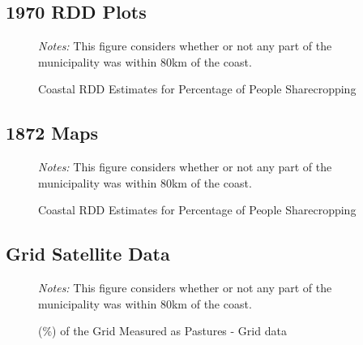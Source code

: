 \documentclass{article}
\begin{document}
\clearpage

\subsection*{1970 RDD Plots}

\begin{figure}[h!]
  \caption{Coastal RDD Estimates for Percentage of People Sharecropping}
  \begin{center}
  \textit{Notes:} This figure considers whether or not any part of the municipality was within 80km of the coast.
  \end{center}
  \label{fig:1970_RDD_Sharecropping}
\end{figure}

\clearpage

\subsection*{1872 Maps}

\begin{figure}[h!]
  \caption{Coastal RDD Estimates for Percentage of People Sharecropping}
  \begin{center}
  \textit{Notes:} This figure considers whether or not any part of the municipality was within 80km of the coast.
  \end{center}
  \label{fig:1872_ranching_maps}
\end{figure}

\clearpage

\subsection*{Grid Satellite Data}

\begin{figure}[h!]
  \caption{(\%) of the Grid Measured as Pastures - Grid data}
  \begin{center}
  \textit{Notes:} This figure considers whether or not any part of the municipality was within 80km of the coast.
  \end{center}
  \label{fig:pasture_grid}
\end{figure}
\end{document}
